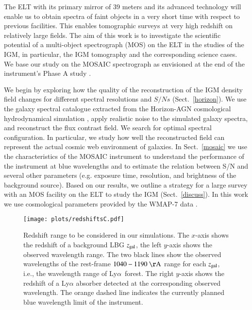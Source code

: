 \documentclass{aa}
\newcommand{\lya}{Ly$\alpha$}
\begin{document}
The ELT with its primary mirror of 39 meters and its advanced technology will enable us to obtain spectra of faint objects in a very short time with respect to previous facilities. This enables tomographic surveys at very high redshift  on relatively large fields. The aim of this work is to investigate the scientific potential of a multi-object spectrograph (MOS) on the ELT in the studies of the IGM, in particular, the IGM tomography and the corresponding science cases. We base our study on the MOSAIC spectrograph as envisioned at the end of the instrument's Phase A study \citep{Morris2018}. 

We begin by exploring how the quality of the reconstruction of the IGM density field changes for different spectral resolutions and $S/Ns$  (Sect.~\ref{horizon}). We use the galaxy spectral catalogue extracted from the {\sc Horizon-AGN} cosmological hydrodynamical simulation \citep{Dubois2014}, apply realistic noise to the simulated galaxy spectra, and  reconstruct the flux contrast field. We search for optimal spectral configuration. In particular, we study how well the reconstructed field can represent the actual cosmic web environment of galaxies. In Sect.~\ref{mosaic} we use the characteristics of the MOSAIC instrument to understand the performance of the instrument at blue wavelengths and to estimate the relation between S/N and several other parameters (e.g. exposure time, resolution, and brightness of the background source). Based on our results, we outline a strategy for a large survey with an MOS facility on the ELT to study the IGM (Sect.~\ref{discuss}). In this work we use cosmological parameters provided by the WMAP-7 data \citep{Komatsu2011}.

\begin{figure}
\begin{center}
\texttt{[image: plots/redshiftsC.pdf]}
\caption{Redshift range to be considered in our simulations. The $x$-axis shows the redshift of a background LBG $z_{\rm gal}$, the left $y$-axis shows the observed wavelength range. The two black lines show the observed wavelengths of the rest-frame $1040-1190~\mathrm{\AA}$ range for each $z_{\rm gal}$, i.e., the wavelength range of \lya\, forest. The right $y$-axis shows the redshift of a Ly$\alpha$ absorber detected at the corresponding observed wavelength. The orange dashed line indicates the currently planned blue wavelength limit of the instrument.}
\label{fig1}
\end{center}
\end{figure}
\end{document}
